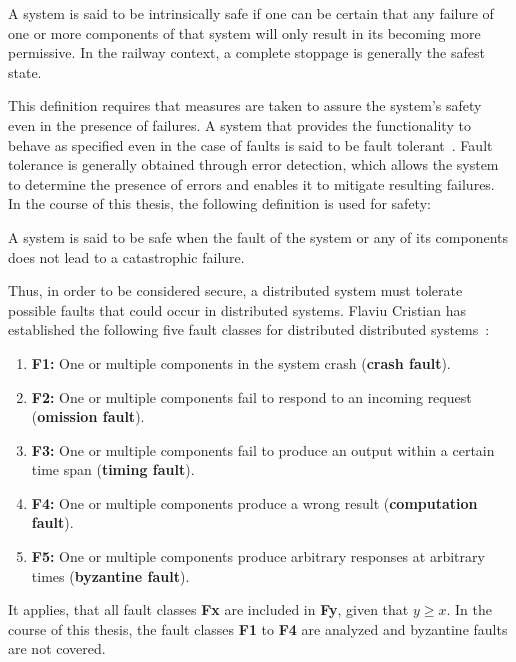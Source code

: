 \begin{definition}
A system is said to be intrinsically safe if one can be certain that any failure of one or more components of that system will only result in its becoming more permissive.
In the railway context, a complete stoppage is generally the safest state.
\label{def:intrinsic_safety}
\end{definition}

This definition requires that measures are taken to assure the system's safety even in the presence of failures.
A system that provides the functionality to behave as specified even in the case of faults is said to be fault tolerant~\cite{AvizienisDependability2001}.
Fault tolerance is generally obtained through error detection, which allows the system to determine the presence of errors and enables it to mitigate resulting failures.
In the course of this thesis, the following definition is used for safety:

\begin{definition}
A system is said to be safe when the fault of the system or any of its components does not lead to a catastrophic failure.
\label{def:safety}
\end{definition}

Thus, in order to be considered secure, a distributed system must tolerate possible faults that could occur in distributed systems.
Flaviu Cristian has established the following five fault classes for distributed distributed systems~\cite{CristianFaultModel}:

\begin{enumerate}
\item \textbf{F1:} One or multiple components in the system crash (\textbf{crash fault}).
\item \textbf{F2:} One or multiple components fail to respond to an incoming request (\textbf{omission fault}).
\item \textbf{F3:} One or multiple components fail to produce an output within a certain time span (\textbf{timing fault}).
\item \textbf{F4:} One or multiple components produce a wrong result (\textbf{computation fault}).
\item \textbf{F5:} One or multiple components produce arbitrary responses at arbitrary times (\textbf{byzantine fault}).
\end{enumerate}

It applies, that all fault classes \textbf{Fx} are included in \textbf{Fy}, given that $y \geq x$.
In the course of this thesis, the fault classes \textbf{F1} to \textbf{F4} are analyzed and byzantine faults are not covered.

